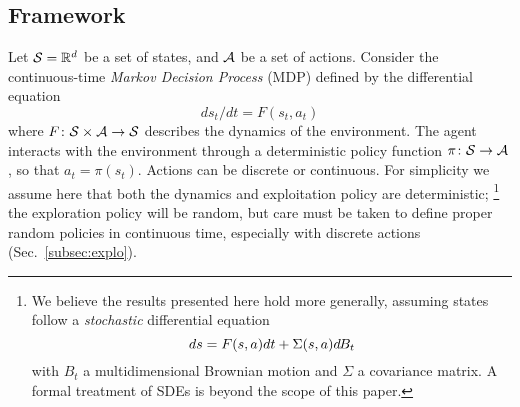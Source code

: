 \subsection{Framework}





      
Let ${\cal S} = \mathbb{R}^d$ be a set of states, and ${\cal A}$ be a set of
actions. Consider the continuous-time \emph{Markov Decision Process} (MDP) defined by the differential equation %
        \begin{equation}
	\label{eq:diffusion}
	ds_t/dt = F(s_t, a_t) %
              \end{equation}
where $F\colon {\cal S}\times{\cal A}\rightarrow {\cal S}$ describes
the dynamics of the environment. The agent interacts with the environment through a deterministic policy function
$\pi \colon {\cal S} \rightarrow {\cal A}$, so that $a_t=\pi(s_t)$.
Actions can be discrete or continuous. 
For simplicity we assume here that both the dynamics and exploitation policy are
deterministic; \footnote{
      We believe the results presented here hold more
      generally, assuming states
      follow a \emph{stochastic} differential equation \begin{equation}
	      ds = F(s, a)dt  + \Sigma(s, a)d\hspace{-.1em}B_t
	      \label{eq:sde}
      \end{equation} with
      $B_t$ a multidimensional Brownian motion and $\Sigma$ a covariance matrix. A
      formal treatment of SDEs is beyond the scope of this paper.}
 the exploration policy will be random, but care must be
taken to define proper random policies 
in continuous time, especially with discrete actions (Sec.~\ref{subsec:explo}).

